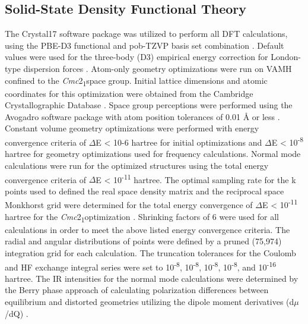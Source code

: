 \subsection{Solid-State Density Functional Theory}
The Crystal17 software package was utilized to perform all DFT calculations, using the PBE-D3 functional and pob-TZVP \citep{Peintinger2013} basis set combination \citep{Dovesi2017,Dovesi2014}. Default values were used for the three-body (D3) empirical energy correction for London-type dispersion forces \citep{Dovesi2017,Grimme2010,Grimme2011,Grimme2016}. Atom-only geometry optimizations were run on VAMH confined to the \textit{Cmc}2\textsubscript{1}space group. Initial lattice dimensions and atomic coordinates for this optimization were obtained from the Cambridge Crystallographic Database \cite{nichol_violuric_2005,groom_cambridge_2016}. Space group perceptions were performed using the Avogadro software package with atom position tolerances of 0.01 Å or less \citep{avogadro}. Constant volume geometry optimizations were performed with energy convergence criteria of \(\Delta\)E < 10-6 hartree for initial optimizations and \(\Delta\)E < 10\textsuperscript{-8} hartree for geometry optimizations used for frequency calculations. Normal mode calculations were run for the optimized structures using the total energy convergence criteria of \(\Delta\)E < 10\textsuperscript{-11} hartree. The optimal sampling rate for the k points used to defined the real space density matrix and the reciprocal space Monkhorst grid were determined for the total energy convergence of \(\Delta\)E < 10\textsuperscript{-11} hartree for the \textit{Cmc}2\textsubscript{1}optimization \citep{Gilat1972,monkhorst}. Shrinking factors of 6 were used for all calculations in order to meet the above listed energy convergence criteria. The radial and angular distributions of points were defined by a pruned (75,974) integration grid for each calculation. The truncation tolerances for the Coulomb and HF exchange integral series were set to 10\textsuperscript{-8}, 10\textsuperscript{-8}, 10\textsuperscript{-8}, 10\textsuperscript{-8}, and 10\textsuperscript{-16} hartree. The IR intensities for the normal mode calculations were determined by the Berry phase approach of calculating polarization differences between equilibrium and distorted geometries utilizing the dipole moment derivatives (d\(\mu\)/dQ) \citep{pascale_calculation_2004, Kudin2007,Wu1993}.

